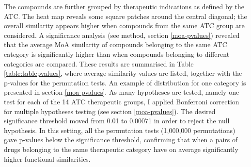 The compounds are further grouped by therapeutic indications as defined by the ATC. The heat map reveals some square patches around the central diagonal; the overall similarity appears higher when compounds from the same ATC group are considered.
A significance analysis (see method, section \ref{moa-pvalues}) revealed that the average MoA similarity of compounds belonging to the same ATC category is significantly higher than when compounds belonging to different categories are compared. These results are summarised in Table \ref{table:tablepvalues}, where average similarity values are listed, together with the p-values for the permutation tests. An example of distribution for one category is presented in section \ref{moa-pvalues}.
As many hypotheses are tested, namely one test for each of the 14 ATC therapeutic groups, I applied Bonferroni correction for multiple hypotheses testing (see section \ref{moa-pvalues}). The desired significance threshold moved from 0.01 to 0.00071 in order to reject the null hypothesis. In this setting, all the permutation tests (1,000,000 permutations) gave p-values below the significance threshold, confirming that when a pairs of drugs belonging to the same therapeutic category have on average significantly higher functional similarities.

